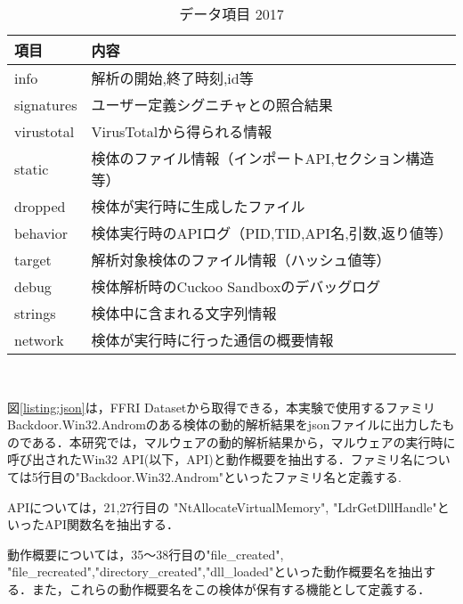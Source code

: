 \documentclass{thesis}
\begin{document}
\begin{table}[H]
\begin{center}
  \caption{データ項目 2017}
\label{table:2017}
\begin{tabular}{|l|l|} \hline
項目 & 内容  \\ 
\hline \hline
info & 解析の開始,終了時刻,id等 \\ \hline
signatures &ユーザー定義シグニチャとの照合結果  \\ \hline
virustotal &   VirusTotalから得られる情報 \\ \hline
 static& 検体のファイル情報（インポートAPI,セクション構造等） \\ \hline
 dropped& 検体が実行時に生成したファイル \\ \hline
behavior &検体実行時のAPIログ（PID,TID,API名,引数,返り値等）  \\ \hline
 target& 解析対象検体のファイル情報（ハッシュ値等） \\ \hline
debug & 検体解析時のCuckoo Sandboxのデバッグログ \\ \hline
strings  & 検体中に含まれる文字列情報 \\ \hline
network & 検体が実行時に行った通信の概要情報 \\ \hline
\end{tabular} 　
\end{center}
\end{table}


図\ref{listing:json}は，FFRI Datasetから取得できる，本実験で使用するファミリBackdoor.Win32.Andromのある検体の動的解析結果をjsonファイルに出力したものである．本研究では，マルウェアの動的解析結果から，マルウェアの実行時に呼び出されたWin32 API(以下，API)と動作概要を抽出する．ファミリ名については5行目の"Backdoor.Win32.Androm"といったファミリ名と定義する.

APIについては，21,27行目の "NtAllocateVirtualMemory", "LdrGetDllHandle"といったAPI関数名を抽出する．

動作概要については，35～38行目の"file\_created", "file\_recreated","directory\_created","dll\_loaded"といった動作概要名を抽出する．また，これらの動作概要名をこの検体が保有する機能として定義する．

\newpage

\renewcommand{\lstlistingname}{図}
\end{document}
